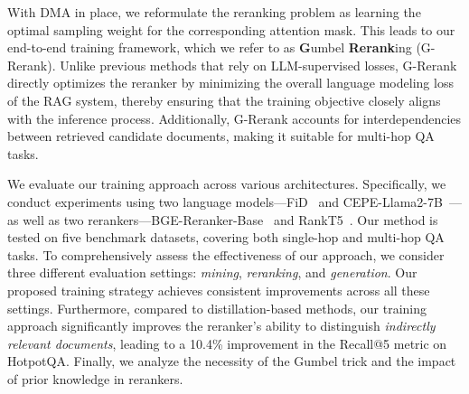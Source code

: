With DMA in place, we reformulate the reranking problem as learning the optimal sampling weight for the corresponding attention mask. This leads to our end-to-end training framework, which we refer to as \textbf{G}umbel \textbf{Rerank}ing (G-Rerank). Unlike previous methods that rely on LLM-supervised losses, G-Rerank directly optimizes the reranker by minimizing the overall language modeling loss of the RAG system, thereby ensuring that the training objective closely aligns with the inference process. Additionally, G-Rerank accounts for interdependencies between retrieved candidate documents, making it suitable for multi-hop QA tasks.

We evaluate our training approach across various architectures. Specifically, we conduct experiments using two language models—FiD~\cite{DBLP:conf/eacl/IzacardG21} and CEPE-Llama2-7B~\cite{DBLP:conf/acl/YenG024}—as well as two rerankers—BGE-Reranker-Base~\cite{xiao2023bge} and RankT5~\cite{DBLP:conf/sigir/Zhuang0J0MLNWB23}. Our method is tested on five benchmark datasets, covering both single-hop and multi-hop QA tasks. To comprehensively assess the effectiveness of our approach, we consider three different evaluation settings: \textit{mining}, \textit{reranking}, and \textit{generation}. Our proposed training strategy achieves consistent improvements across all these settings. Furthermore, compared to distillation-based methods, our training approach significantly improves the reranker's ability to distinguish \textit{indirectly relevant documents}, leading to a 10.4\% improvement in the Recall@5 metric on HotpotQA. Finally, we analyze the necessity of the Gumbel trick and the impact of prior knowledge in rerankers.


